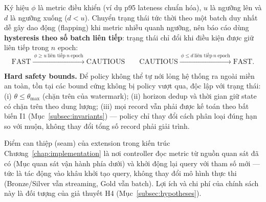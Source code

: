 Ký hiệu $\phi$ là metric điều khiển (ví dụ p95 lateness chuẩn hóa), $u$ là
ngưỡng lên và $d$ là ngưỡng xuống ($d < u$). Chuyển trạng thái tức thời theo
một batch duy nhất dễ gây dao động (flapping) khi metric nhiễu quanh ngưỡng,
nên báo cáo dùng \textbf{hysteresis theo số batch liên tiếp}: trạng thái chỉ
đổi khi điều kiện được giữ liên tiếp trong $n$ epoch:
\begin{equation}
  \text{FAST} \xrightarrow{\ \phi \geq u\ \text{liên tiếp}\ n\ \text{epoch}\ }
  \text{CAUTIOUS}
  \qquad
  \text{CAUTIOUS} \xrightarrow{\ \phi \leq d\ \text{liên tiếp}\ n\ \text{epoch}\ }
  \text{FAST}.
  \label{eq:hysteresis}
\end{equation}

\textbf{Hard safety bounds.} Để policy không thể tự nới lỏng hệ thống ra ngoài
miền an toàn, tồn tại các bound cứng không bị policy vượt qua, độc lập với
trạng thái: (i) $\theta \leq \theta_{\max}$ (chặn trên của watermark);
(ii) horizon dedup và thời gian giữ state có chặn trên theo dung lượng;
(iii) mọi record vẫn phải được kế toán theo bất biến I1
(Mục~\ref{subsec:invariants}) --- policy chỉ thay đổi cách phân loại đúng hạn
so với muộn, không thay đổi tổng số record phải giải trình.

Điểm can thiệp (seam) của extension trong kiến trúc Chương~\ref{chap:implementation}
là nơi controller đọc metric từ nguồn quan sát đã có (Mục quan sát vận hành
phía dưới) và khởi động lại query với tham số mới --- tức là tác động vào khâu
khởi tạo query, không thay đổi mô hình thực thi (Bronze/Silver vẫn streaming,
Gold vẫn batch). Lợi ích và chi phí của chính sách này là đối tượng của giả
thuyết H4 (Mục~\ref{subsec:hypotheses}).

